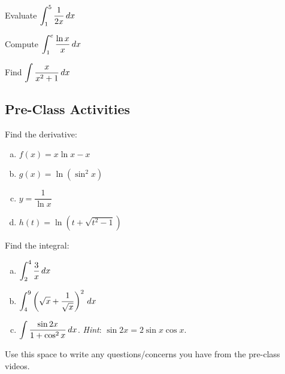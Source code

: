 \documentclass[notes]{subfiles}
\begin{document}
		\begin{ex}
			Evaluate $\displaystyle \int_1^5 \dfrac{1}{2x}\, dx$
		\end{ex}
			
		\begin{ex}
			Compute $\displaystyle \int_1^e \dfrac{\ln x}{x}\, dx$
		\end{ex}
			
		\begin{ex}
			Find $\displaystyle \int \dfrac{x}{x^2 + 1}\, dx$
		\end{ex}
			\newpage
			
	\subsection*{Pre-Class Activities}
		\begin{ex}
		Find the derivative:
			\begin{enumerate}[(a)]
				\item $f(x) = x\ln x - x$
					
				\item $g(x) = \ln (\sin^2x)$
					
				\item $y = \dfrac{1}{\ln x}$
					
				\item $h(t) = \ln(t + \sqrt{t^2-1})$
			\end{enumerate}
		\end{ex}
			\newpage
		\begin{ex}
			Find the integral:
			\begin{enumerate}[(a)]
				\item $\displaystyle \int_2^4 \dfrac{3}{x}\, dx$
					\vs{1}
					
				\item $\displaystyle \int_4^9 \left( \sqrt{x} + \dfrac{1}{\sqrt{x}}\right)^2\, dx$
					\vs{1}
					
				\item $\displaystyle \int \dfrac{\sin 2x}{1+\cos^2 x}\, dx$.  \emph{Hint}: $\sin 2x = 2\sin x\cos x$.
					\vs{1}
			\end{enumerate}
		\end{ex}
		
		\begin{question}
			Use this space to write any questions/concerns you have from the pre-class videos.
		\end{question}
			\vs{1}
			\newpage
			
\end{document}
